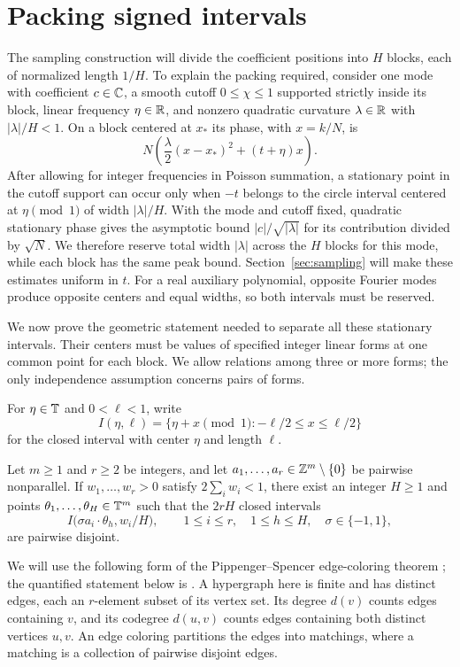 \section{Packing signed intervals}
\label{sec:packing}

The sampling construction will divide the coefficient positions into
$H$ blocks, each of normalized length $1/H$. To explain the packing
required, consider one mode with coefficient $c\in\mathbb C$, a smooth cutoff
$0\le\chi\le1$ supported strictly inside its block, linear frequency
$\eta\in\mathbb R$, and nonzero quadratic curvature $\lambda\in\mathbb R$ with
$|\lambda|/H<1$. On a block centered at $x_*$ its phase, with $x=k/N$, is
\[
 N\left(\frac{\lambda}{2}(x-x_*)^2+(t+\eta)x\right).
\]
After allowing for integer frequencies in Poisson summation, a stationary
point in the cutoff support can occur only when $-t$ belongs to the circle
interval centered at
$\eta\pmod1$ of width $|\lambda|/H$. With the mode and cutoff fixed,
quadratic stationary phase gives the asymptotic bound
$|c|/\sqrt{|\lambda|}$ for its contribution divided by $\sqrt N$.
We therefore reserve total width $|\lambda|$ across the $H$ blocks for
this mode, while each block has the same peak bound. Section~\ref{sec:sampling}
will make these estimates uniform in $t$. For a real auxiliary polynomial,
opposite Fourier modes produce opposite centers and equal widths, so both
intervals must be reserved.

We now prove the geometric statement needed to separate all these
stationary intervals. Their centers must be values of specified integer
linear forms at one common point for each block. We allow relations
among three or more forms; the only independence assumption concerns
pairs of forms.

For $\eta\in\mathbb T$ and $0<\ell<1$, write
\[
 I(\eta,\ell)=\{\eta+x\pmod 1:-\ell/2\le x\le\ell/2\}
\]
for the closed interval with center $\eta$ and length $\ell$.

\begin{lemma}
\label{lem:signed-packing}
Let $m\ge1$ and $r\ge2$ be integers, and let $a_1,\ldots,a_r\in\mathbb Z^m\setminus\{0\}$
be pairwise nonparallel.  If $w_1,\ldots,w_r>0$ satisfy
$2\sum_iw_i<1$, there exist an integer $H\ge1$ and points
$\theta_1,\ldots,\theta_H\in\mathbb T^m$ such that the $2rH$ closed intervals
\[
 I\bigl(\sigma a_i\cdot\theta_h,w_i/H\bigr),
 \qquad 1\le i\le r,\quad 1\le h\le H,\quad \sigma\in\{-1,1\},
\]
are pairwise disjoint.
\end{lemma}

We will use the following form of the Pippenger--Spencer edge-coloring
theorem \cite{PippengerSpencer1989}; the quantified statement below is
\cite[Lemma~2.1]{AlonYuster2005}.  A hypergraph here is finite and has distinct edges,
each an $r$-element subset of its vertex set.  Its degree $d(v)$ counts
edges containing $v$, and its codegree $d(u,v)$ counts edges containing
both distinct vertices $u,v$.  An edge coloring partitions the edges
into matchings, where a matching is a collection of pairwise disjoint edges.

